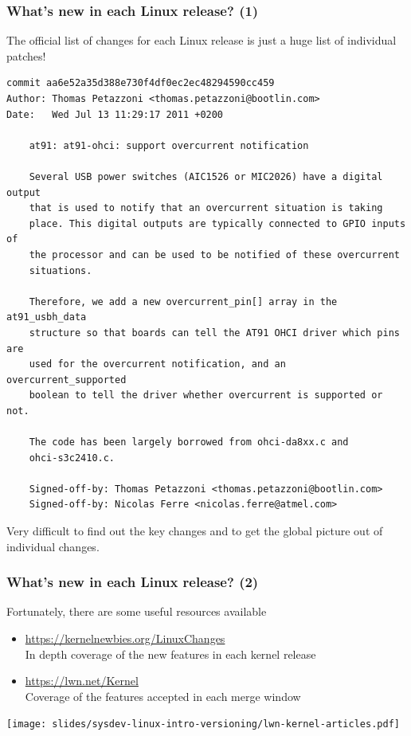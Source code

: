 \begin{frame}[fragile]
  \frametitle{What's new in each Linux release? (1)}
  The official list of changes for each Linux release is just a
  huge list of individual patches!
\Tiny
    \begin{verbatim}
commit aa6e52a35d388e730f4df0ec2ec48294590cc459
Author: Thomas Petazzoni <thomas.petazzoni@bootlin.com>
Date:   Wed Jul 13 11:29:17 2011 +0200

    at91: at91-ohci: support overcurrent notification

    Several USB power switches (AIC1526 or MIC2026) have a digital output
    that is used to notify that an overcurrent situation is taking
    place. This digital outputs are typically connected to GPIO inputs of
    the processor and can be used to be notified of these overcurrent
    situations.

    Therefore, we add a new overcurrent_pin[] array in the at91_usbh_data
    structure so that boards can tell the AT91 OHCI driver which pins are
    used for the overcurrent notification, and an overcurrent_supported
    boolean to tell the driver whether overcurrent is supported or not.

    The code has been largely borrowed from ohci-da8xx.c and
    ohci-s3c2410.c.

    Signed-off-by: Thomas Petazzoni <thomas.petazzoni@bootlin.com>
    Signed-off-by: Nicolas Ferre <nicolas.ferre@atmel.com>
\end{verbatim}
\normalsize
  Very difficult to find out the key changes and to get the
  global picture out of individual changes.
\end{frame}

\begin{frame}
  \frametitle{What's new in each Linux release? (2)}
  Fortunately, there are some useful resources available
  \begin{itemize}
    \item \url{https://kernelnewbies.org/LinuxChanges}\\
	In depth coverage of the new features in each kernel release
    \item \url{https://lwn.net/Kernel}\\
	Coverage of the features accepted in each merge window
  \end{itemize}
  \begin{center}
    \texttt{[image: slides/sysdev-linux-intro-versioning/lwn-kernel-articles.pdf]}
  \end{center}
\end{frame}
